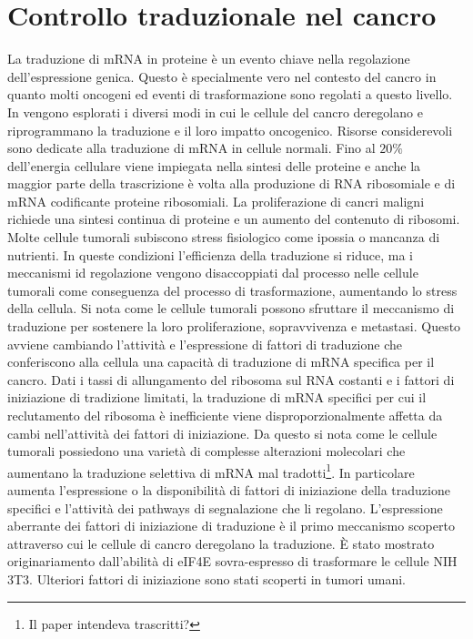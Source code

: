 \section{Controllo traduzionale nel cancro}
La traduzione di mRNA in proteine \`e un evento chiave nella regolazione dell'espressione genica.
Questo \`e specialmente vero nel contesto del cancro in quanto molti oncogeni ed eventi di trasformazione sono regolati a questo livello.
In \cite{transconcancer} vengono esplorati i diversi modi in cui le cellule del cancro deregolano e riprogrammano la traduzione e il loro impatto oncogenico.
Risorse considerevoli sono dedicate alla traduzione di mRNA in cellule normali.
Fino al $20\%$ dell'energia cellulare viene impiegata nella sintesi delle proteine e anche la maggior parte della trascrizione \`e volta alla produzione di RNA ribosomiale e di mRNA codificante proteine ribosomiali.
La proliferazione di cancri maligni richiede una sintesi continua di proteine e un aumento del contenuto di ribosomi.
Molte cellule tumorali subiscono stress fisiologico come ipossia o mancanza di nutrienti.
In queste condizioni l'efficienza della traduzione si riduce, ma i meccanismi id regolazione vengono disaccoppiati dal processo nelle cellule tumorali come conseguenza del processo di trasformazione, aumentando lo stress della cellula.
Si nota come le cellule tumorali possono sfruttare il meccanismo di traduzione per sostenere la loro proliferazione, sopravvivenza e metastasi.
Questo avviene cambiando l'attivit\`a e l'espressione di fattori di traduzione che conferiscono alla cellula una capacit\`a di traduzione di mRNA specifica per il cancro.
Dati i tassi di allungamento del ribosoma sul RNA costanti e i fattori di iniziazione di tradizione limitati, la traduzione di mRNA specifici per cui il reclutamento del ribosoma \`e inefficiente viene disproporzionalmente affetta da cambi nell'attivit\`a dei fattori di iniziazione.
Da questo si nota come le cellule tumorali possiedono una variet\`a di complesse alterazioni molecolari che aumentano la traduzione selettiva di mRNA mal tradotti\footnote{Il paper intendeva trascritti?}.
In particolare aumenta l'espressione o la disponibilit\`a di fattori di iniziazione della traduzione specifici e l'attivit\`a dei pathways di segnalazione che li regolano.
L'espressione aberrante dei fattori di iniziazione di traduzione \`e il primo meccanismo scoperto attraverso cui le cellule di cancro deregolano la traduzione.
\`E stato mostrato originariamento dall'abilit\`a di eIF4E sovra-espresso di trasformare le cellule NIH 3T3.
Ulteriori fattori di iniziazione sono stati scoperti in tumori umani.

